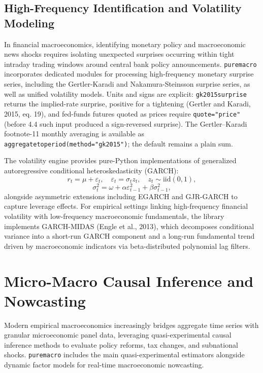 \documentclass[11pt,letterpaper]{article}
\renewcommand{\_}{\pmunderscore\allowbreak}
\begin{document}
\subsection{High-Frequency Identification and Volatility Modeling}\label{high-frequency-identification-and-volatility-modeling}

In financial macroeconomics, identifying monetary policy and macroeconomic news shocks requires isolating unexpected surprises occurring within tight intraday trading windows around central bank policy announcements. \texttt{puremacro} incorporates dedicated modules for processing high-frequency monetary surprise series, including the Gertler-Karadi and Nakamura-Steinsson surprise series, as well as unified volatility models. Units and signs are explicit: \texttt{gk2015\_surprise} returns the implied-rate surprise, positive for a tightening (Gertler and Karadi, 2015, eq. 19), and fed-funds futures quoted as prices require \texttt{quote="price"} (before 4.4 such input produced a sign-reversed surprise). The Gertler--Karadi footnote-11 monthly averaging is available as \texttt{aggregate\_to\_period(method="gk2015")}; the default remains a plain sum.

The volatility engine provides pure-Python implementations of generalized autoregressive conditional heteroskedasticity (GARCH):
\[r_t = \mu + \varepsilon_t, \quad \varepsilon_t = \sigma_t z_t, \quad z_t \sim \text{iid}(0, 1),\]
\[\sigma_t^2 = \omega + \alpha \varepsilon_{t-1}^2 + \beta \sigma_{t-1}^2,\]
alongside asymmetric extensions including EGARCH and GJR-GARCH to capture leverage effects. For empirical settings linking high-frequency financial volatility with low-frequency macroeconomic fundamentals, the library implements GARCH-MIDAS (Engle et al., 2013), which decomposes conditional variance into a short-run GARCH component and a long-run fundamental trend driven by macroeconomic indicators via beta-distributed polynomial lag filters.

\section{Micro-Macro Causal Inference and Nowcasting}\label{micro-macro-causal-inference-and-nowcasting}

Modern empirical macroeconomics increasingly bridges aggregate time series with granular microeconomic panel data, leveraging quasi-experimental causal inference methods to evaluate policy reforms, tax changes, and subnational shocks. \texttt{puremacro} includes the main quasi-experimental estimators alongside dynamic factor models for real-time macroeconomic nowcasting.
\end{document}

